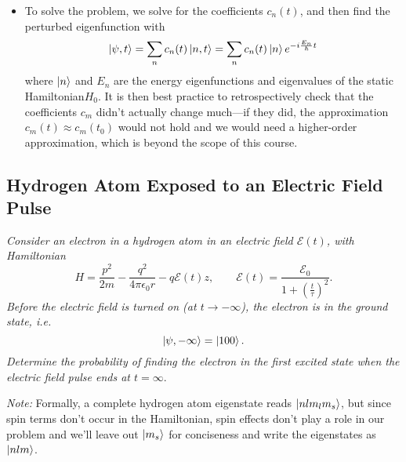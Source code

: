\documentclass[11pt, a4paper]{article}
\newcommand{\Ham}{Hamiltonian\xspace}
\newcommand{\p}{\psi}  %
\newcommand{\E}{\mathcal{E}}  %
\begin{document}
\begin{itemize}
	\item To solve the problem, we solve for the coefficients $ c_{n}(t) $, and then find the perturbed eigenfunction with
	\begin{equation*}
		\ket{\p, t} = \sum_{n}c_{n}(t)\ket{n, t} = \sum_{n}c_{n}(t) \ket{n}e^{-i\frac{E_{n}}{\hbar}t}
	\end{equation*}
	where $ \ket{n} $ and $ E_{n} $ are the energy eigenfunctions and eigenvalues of the static \Ham $ H_{0} $. It is then best practice to retrospectively check that the coefficients $ c_{m} $ didn't actually change much---if they did, the approximation $ c_{m}(t) \approx c_{m}(t_{0}) $ would not hold and we would need a higher-order approximation, which is beyond the scope of this course.
	
\end{itemize}

\subsection{Hydrogen Atom Exposed to an Electric Field Pulse}
\textit{Consider an electron in a hydrogen atom in an electric field $ \E(t) $, with \Ham}
\begin{equation*}
	H = \frac{p^{2}}{2m} - \frac{q^{2}}{4 \pi \epsilon_{0} r} - q \E(t)z, \qquad \E(t) = \frac{\E_{0}}{1 + \left(\frac{t}{\tau}\right)^{2}}.
\end{equation*}
\textit{Before the electric field is turned on (at $ t \to - \infty $), the electron is in the ground state, i.e.}
\begin{equation*}
	\ket{\p, - \infty} = \ket{100}.
\end{equation*}
\textit{Determine the probability of finding the electron in the first excited state when the electric field pulse ends at $ t = \infty $}.

\vspace{2mm}
\textit{Note:} Formally, a complete hydrogen atom eigenstate reads $ \ket{nlm_{l}m_{s}} $, but since spin terms don't occur in the \Ham, spin effects don't play a role in our problem and we'll leave out $ \ket{m_{s}} $ for conciseness and write the eigenstates as $ \ket{nlm} $.
	
\end{document}
